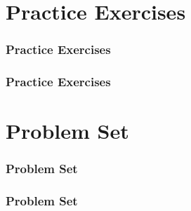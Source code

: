 \documentclass{beamer}
\begin{document}
\section{Practice Exercises} 
\begin{frame} 
\frametitle{Practice Exercises} 
 
\end{frame}

\begin{frame} 
\frametitle{Practice Exercises}
 
\end{frame}

\section{Problem Set} 
\begin{frame} 
\frametitle{Problem Set} 
 
\end{frame}

\begin{frame} 
\frametitle{Problem Set} 
 
\end{frame}
\end{document}
